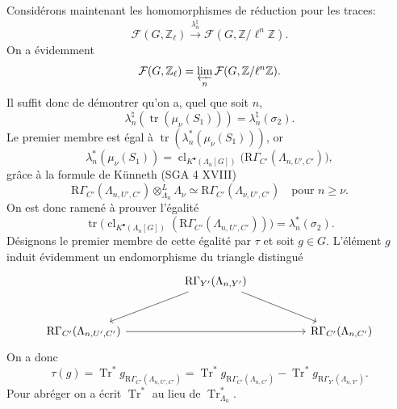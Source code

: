 \documentclass[11pt]{article}
\newcommand{\R}{\mathrm{R}}\newcommand{\RHomCore}{\mathrm{RHom}}
\providecommand{\Tr}{\operatorname{Tr}}
\providecommand{\Tr}{\operatorname{Tr}}
\providecommand{\Tr}{\operatorname{Tr}}
\providecommand{\R}{\mathrm R}
\providecommand{\Tr}{\operatorname{Tr}}
\providecommand{\clKstar}[1]{\operatorname{cl}_{K^{\bullet}(#1)}}
\providecommand{\RG}{\R\Gamma}
\providecommand{\Tr}{\operatorname{Tr}}
\begin{document}
Considérons maintenant les homomorphismes de réduction pour les traces:
\[
\mathcal F(G,\mathbb Z_\ell)\xrightarrow{\lambda_n^\natural}\mathcal F(G,\mathbb Z/\ell^n\mathbb Z).
\]
On a évidemment
\[
\mathcal F(G,\mathbb Z_\ell)=\varprojlim_n\mathcal F(G,\mathbb Z/\ell^n\mathbb Z).
\]
Il suffit donc de démontrer qu'on a, quel que soit $n$,
\[
\lambda_n^\natural(\operatorname{tr}(\mu_\nu(S_1)))=\lambda_n^\natural(\sigma_2).
\]
Le premier membre est égal à $\operatorname{tr}(\lambda_n^*(\mu_\nu(S_1)))$, or
\[
\lambda_n^*(\mu_\nu(S_1))
=
\clKstar{\Lambda_n[G]}\bigl(\RG_{C'}(\Lambda_{n,U',C'})\bigr),
\]
grâce à la formule de Künneth (SGA 4 XVIII)
\[
\RG_{C'}(\Lambda_{n,U',C'})\otimes_{\Lambda_n}^{L}\Lambda_\nu
\simeq \RG_{C'}(\Lambda_{\nu,U',C'})
\quad\text{pour } n\ge\nu.
\]
On est donc ramené à prouver l'égalité
\[
\operatorname{tr}\bigl(\clKstar{\Lambda_n[G]}(\RG_{C'}(\Lambda_{n,U',C'}))\bigr)
=
\lambda_n^*(\sigma_2).
\]
Désignons le premier membre de cette égalité par $\tau$ et soit $g\in G$. L'élément $g$ induit évidemment un endomorphisme du triangle distingué
\[
\begin{tikzcd}[column sep=huge,row sep=large]
& \RG_{Y'}(\Lambda_{n,Y'}) \arrow[dl] \arrow[dr] & \\
\RG_{C'}(\Lambda_{n,U',C'}) \arrow[rr] && \RG_{C'}(\Lambda_{n,C'})
\end{tikzcd}
\]
On a donc
\[
\tau(g)=\Tr^*g_{\RG_{C'}(\Lambda_{n,U',C'})}
=\Tr^*g_{\RG_{C'}(\Lambda_{n,C'})}
-\Tr^*g_{\RG_{Y'}(\Lambda_{n,Y'})}.
\]
Pour abréger on a écrit $\Tr^*$ au lieu de $\Tr^*_{\Lambda_n}$.
\end{document}
